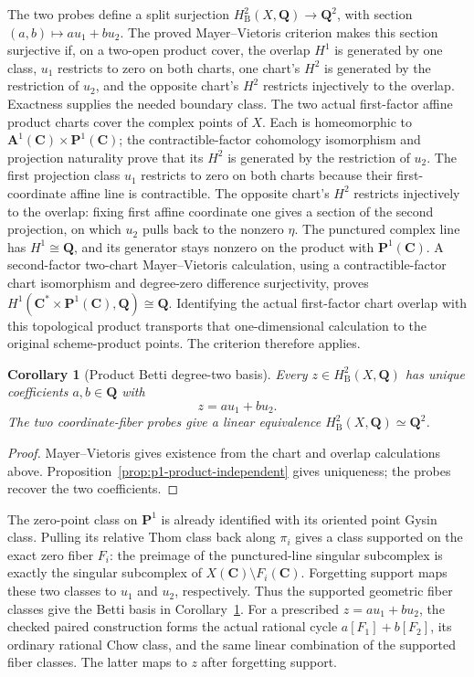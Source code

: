 \documentclass[11pt]{article}
\newtheorem{corollary}[theorem]{Corollary}
\theoremstyle{definition}
\theoremstyle{remark}
\newcommand{\Q}{\mathbf Q}
\begin{document}
The two probes define a split surjection \(H^2_{\mathrm B}(X,\Q)\to\Q^2\),
with section \((a,b)\mapsto a u_1+b u_2\). The proved Mayer--Vietoris
criterion makes this section surjective if, on a two-open product cover,
the overlap \(H^1\) is generated by one class, \(u_1\) restricts to zero
on both charts, one chart's \(H^2\) is generated by the restriction of
\(u_2\), and the opposite chart's \(H^2\) restricts injectively to the
overlap. Exactness supplies the needed boundary class. The two actual
first-factor affine product charts cover the complex points of \(X\).
Each is homeomorphic to \(\mathbf A^1(\mathbf C)\times\mathbf P^1(\mathbf C)\);
the contractible-factor cohomology isomorphism and projection naturality
prove that its \(H^2\) is generated by the restriction of \(u_2\).
The first projection class \(u_1\) restricts to zero on both charts because
their first-coordinate affine line is contractible.
The opposite chart's \(H^2\) restricts injectively to the overlap: fixing
first affine coordinate one gives a section of the second projection, on
which \(u_2\) pulls back to the nonzero \(\eta\).
The punctured complex line has \(H^1\cong\Q\), and its generator stays
nonzero on the product with \(\mathbf P^1(\mathbf C)\). A second-factor
two-chart Mayer--Vietoris calculation, using a contractible-factor chart
isomorphism and degree-zero difference surjectivity, proves
\(H^1(\mathbf C^*\times\mathbf P^1(\mathbf C),\Q)\cong\Q\). Identifying the
actual first-factor chart overlap with this topological product transports
that one-dimensional calculation to the original scheme-product points.
The criterion therefore applies.

\begin{corollary}[Product Betti degree-two basis]
\label{cor:p1-product-h2-basis}
Every \(z\in H^2_{\mathrm B}(X,\Q)\) has unique coefficients \(a,b\in\Q\) with
\[
  z=a u_1+b u_2.
\]
The two coordinate-fiber probes give a linear equivalence
\(H^2_{\mathrm B}(X,\Q)\simeq\Q^2\).
\end{corollary}
\begin{proof}
Mayer--Vietoris gives existence from the chart and overlap calculations
above. Proposition~\ref{prop:p1-product-independent} gives uniqueness;
the probes recover the two coefficients.
\end{proof}

The zero-point class on \(\mathbf P^1\) is already identified with its
oriented point Gysin class. Pulling its relative Thom class back along
\(\pi_i\) gives a class supported on the exact zero fiber \(F_i\): the
preimage of the punctured-line singular subcomplex is exactly the singular
subcomplex of \(X(\mathbf C)\setminus F_i(\mathbf C)\). Forgetting support
maps these two classes to \(u_1\) and \(u_2\), respectively. Thus the
supported geometric fiber classes give the Betti basis in
Corollary~\ref{cor:p1-product-h2-basis}.
For a prescribed \(z=a u_1+b u_2\), the checked paired construction
forms the actual rational cycle \(a[F_1]+b[F_2]\), its ordinary rational
Chow class, and the same linear combination of the supported fiber
classes. The latter maps to \(z\) after forgetting support.
\end{document}
